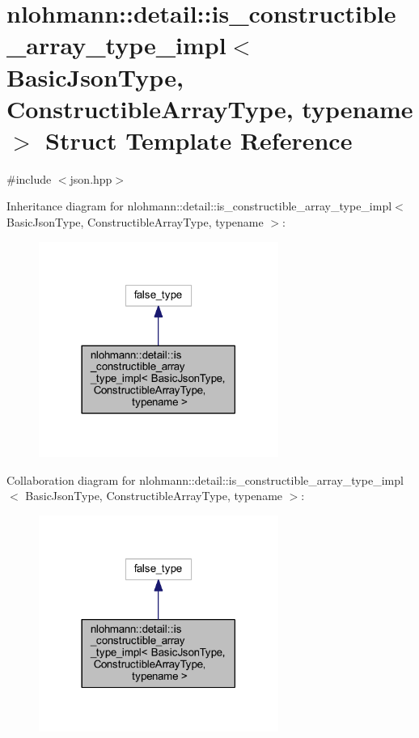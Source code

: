 \hypertarget{structnlohmann_1_1detail_1_1is__constructible__array__type__impl}{}\section{nlohmann\+::detail\+::is\+\_\+constructible\+\_\+array\+\_\+type\+\_\+impl$<$ Basic\+Json\+Type, Constructible\+Array\+Type, typename $>$ Struct Template Reference}
\label{structnlohmann_1_1detail_1_1is__constructible__array__type__impl}


{\ttfamily \#include $<$json.\+hpp$>$}



Inheritance diagram for nlohmann\+::detail\+::is\+\_\+constructible\+\_\+array\+\_\+type\+\_\+impl$<$ Basic\+Json\+Type, Constructible\+Array\+Type, typename $>$\+:
\nopagebreak
\begin{figure}[H]
\begin{center}
\leavevmode
\includegraphics[width=222pt]{structnlohmann_1_1detail_1_1is__constructible__array__type__impl__inherit__graph}
\end{center}
\end{figure}


Collaboration diagram for nlohmann\+::detail\+::is\+\_\+constructible\+\_\+array\+\_\+type\+\_\+impl$<$ Basic\+Json\+Type, Constructible\+Array\+Type, typename $>$\+:
\nopagebreak
\begin{figure}[H]
\begin{center}
\leavevmode
\includegraphics[width=222pt]{structnlohmann_1_1detail_1_1is__constructible__array__type__impl__coll__graph}
\end{center}
\end{figure}



